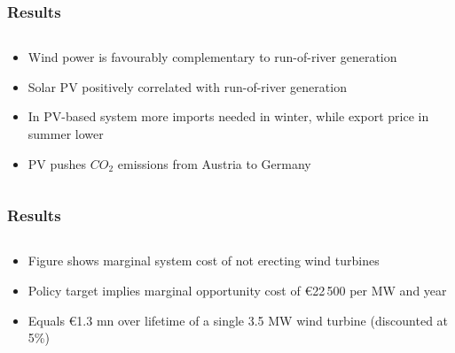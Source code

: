 \documentclass[aspectratio=1610, xcolor=dvipsnames]{beamer}
\begin{document}
    \begin{frame}
        \frametitle{Results}
        \begin{columns}[T]
            \begin{column}{5.0 cm}
                \bigskip
                \begin{itemize}
                    \item Wind power is favourably complementary to run-of-river generation
                    \item Solar PV positively correlated with run-of-river generation
                    \item In PV-based system more imports needed in winter, while export price in summer lower
                    \item PV pushes $CO_2$ emissions from Austria to Germany
                \end{itemize}
            \end{column}
        \end{columns}
    \end{frame}

    \begin{frame}
        \frametitle{Results}
        \begin{columns}[T]
            \begin{column}{5.0 cm}
                \bigskip
                \begin{itemize}
                    \item Figure shows marginal system cost of not erecting wind turbines
                    \item Policy target implies marginal opportunity cost of \euro 22\,500 per MW and year
                    \item Equals \euro 1.3 mn over lifetime of a single 3.5 MW wind turbine (discounted at 5\%)
                \end{itemize}
            \end{column}
        \end{columns}
    \end{frame}
\end{document}

